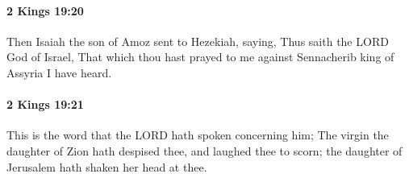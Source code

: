 		\paragraph{2 Kings 19:20} %
			\label{2KINGS-19-20}

			Then Isaiah the son of Amoz sent to Hezekiah, saying, Thus saith the LORD God of Israel, That which thou hast prayed to me against Sennacherib king of Assyria I have heard.


		\paragraph{2 Kings 19:21} %
			\label{2KINGS-19-21}

			This is the word that the LORD hath spoken concerning him; The virgin the daughter of Zion hath despised thee, and laughed thee to scorn; the daughter of Jerusalem hath shaken her head at thee.


